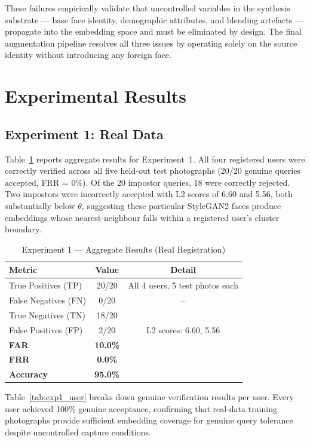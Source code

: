 \documentclass[conference]{IEEEtran}
\begin{document}
These failures empirically validate that uncontrolled variables in the synthesis substrate — base face identity, demographic attributes, and blending artefacts — propagate into the embedding space and must be eliminated by design. The final augmentation pipeline resolves all three issues by operating solely on the source identity without introducing any foreign face.

\section{Experimental Results}

\subsection{Experiment 1: Real Data}

Table~\ref{tab:exp1} reports aggregate results for Experiment~1. All four registered users were correctly verified across all five held-out test photographs (20/20 genuine queries accepted, FRR = 0\%). Of the 20 impostor queries, 18 were correctly rejected. Two impostors were incorrectly accepted with L2 scores of 6.60 and 5.56, both substantially below $\theta$, suggesting these particular StyleGAN2 faces produce embeddings whose nearest-neighbour falls within a registered user's cluster boundary.

\begin{table}[H]
\centering
\caption{Experiment 1 — Aggregate Results (Real Registration)}
\label{tab:exp1}
\renewcommand{\arraystretch}{1.2}
\begin{tabular}{lcc}
\toprule
Metric & Value & Detail \\
\midrule
True Positives (TP) & 20/20 & All 4 users, 5 test photos each \\
False Negatives (FN) & 0/20 & -- \\
True Negatives (TN) & 18/20 & \\
False Positives (FP) & 2/20 & L2 scores: 6.60, 5.56 \\
\midrule
\textbf{FAR} & \textbf{10.0\%} & \\
\textbf{FRR} & \textbf{0.0\%} & \\
\textbf{Accuracy} & \textbf{95.0\%} & \\
\bottomrule
\end{tabular}
\end{table}

Table~\ref{tab:exp1_user} breaks down genuine verification results per user. Every user achieved 100\% genuine acceptance, confirming that real-data training photographs provide sufficient embedding coverage for genuine query tolerance despite uncontrolled capture conditions.
\end{document}

